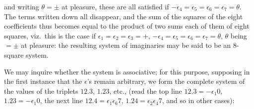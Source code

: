 \documentclass[11pt,a4paper]{article}
\begin{document}
\newpage
\noindent
and writing $\theta=\pm$ at pleasure, these are all satisfied if $-\epsilon_{4}=\epsilon_{5}=\epsilon_{6}=\epsilon_{7}=\theta$. The terms written down all disappear, and the sum of the squares of the eight coefficients thus becomes equal to the product of two sums each of them of eight squares, viz.\ this is the case if $\epsilon_{1}=\epsilon_{2}=\epsilon_{3}=+$, $-\epsilon_{4}=\epsilon_{5}=\epsilon_{6}=\epsilon_{7}=\theta$, $\theta$ being $=\pm$ at pleasure: the resulting system of imaginaries may be said to be an $8$-square system.

We may inquire whether the system is associative; for this purpose,
supposing in the first instance that the $\epsilon$'s remain arbitrary,
we form the complete system of the values of the triplets $12.3$,
$1.23$, etc., (read the top line $12.3=-\epsilon_{1}0$,
$1.23=-\epsilon_{1}0$, the next line $12.4=\epsilon_{1}\epsilon_{6}7$,
$1.24=\epsilon_{2}\epsilon_{4}7$, and so in other cases):
\end{document}
